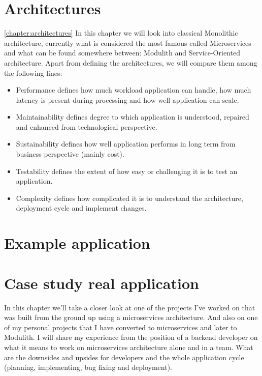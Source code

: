 \chapter{Architectures}
\ref{chapter:architectures}
In this chapter we will look into classical Monolithic architecture, currently what is considered the most famous called Microservices and what can be found somewhere between: Modulith and Service-Oriented architecture. Apart from defining the architectures, we will compare them among the following lines:
\begin{itemize}
    \item Performance defines how much workload application can handle, how much latency is present during processing and how well application can scale.
    \item Maintainability defines degree to which application is understood, repaired and enhanced from technological perspective.  \cite{SOFTWARE_MAINTAINABILITY}
    \item Sustainability defines how well application performs in long term from business perspective (mainly cost).
    \item Testability defines the extent of how easy or challenging it is to test an application.
    \item Complexity defines how complicated it is to understand the architecture, deployment cycle and implement changes.
\end{itemize}






\chapter{Example application}
\label{chapter:example_application}


\chapter{Case study real application}
\label{chapter:personal_experience}
In this chapter we'll take a closer look at one of the projects I've worked on that was built from the ground up using a microservices architecture. And also on one of my personal projects that I have converted to microservices and later to Modulith. I will share my experience from the position of a backend developer on what it means to work on microservices architecture alone and in a team.  What are the downsides and upsides for developers and the whole application cycle (planning, implementing, bug fixing and deployment).

